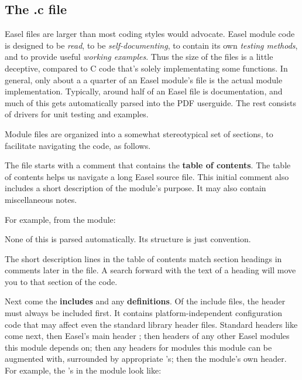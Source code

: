 \subsection{The .c file}

Easel  files are larger than most coding styles would
advocate. Easel module code is designed to be \emph{read}, to be
\emph{self-documenting}, to contain its own \emph{testing methods},
and to provide useful \emph{working examples}.  Thus the size of the
files is a little deceptive, compared to C code that's solely
implementating some functions. In general, only about a a quarter of
an Easel module's  file is the actual module implementation.
Typically, around half of an Easel  file is documentation,
and much of this gets automatically parsed into the PDF userguide. The
rest consists of drivers for unit testing and examples.

Module files are organized into a somewhat stereotypical set of
sections, to facilitate navigating the code, as follows.

The  file starts with a comment that contains the {\bfseries
  table of contents}. The table of contents helps us navigate a long
Easel source file. This initial comment also includes a short
description of the module's purpose. It may also contain miscellaneous
notes.

For example, from the  module:



None of this is parsed automatically. Its structure is just
convention.

The short description lines in the table of contents match section
headings in comments later in the file. A search forward with the text
of a heading will move you to that section of the code.

Next come the {\bfseries includes} and any {\bf definitions}. Of the
include files, the  header must always be
included first. It contains platform-independent configuration code
that may affect even the standard library header files. Standard
headers like  come next, then Easel's main header
; then headers of any other Easel modules this module
depends on; then any headers for modules this module can be augmented
with, surrounded by appropriate 's; then the module's
own header. For example, the 's in the
 module look like:

